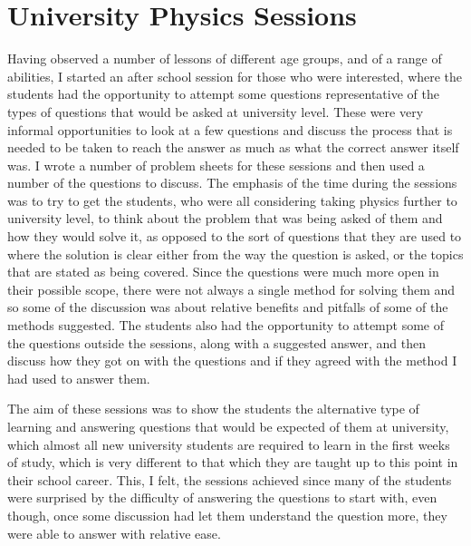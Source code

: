 \section{University Physics Sessions} %
\label{sec:university_physics_sessions}
	Having observed a number of lessons of different age groups, and of a range of abilities, I started an after school session for those who were interested, where the students had the opportunity to attempt some questions representative of the types of questions that would be asked at university level. These were very informal opportunities to look at a few questions and discuss the process that is needed to be taken to reach the answer as much as what the correct answer itself was. I wrote a number of problem sheets for these sessions and then used a number of the questions to discuss. The emphasis of the time during the sessions was to try to get the students, who were all considering taking physics further to university level, to think about the problem that was being asked of them and how they would solve it, as opposed to the sort of questions that they are used to where the solution is clear either from the way the question is asked, or the topics that are stated as being covered. Since the questions were much more open in their possible scope, there were not always a single method for solving them and so some of the discussion was about relative benefits and pitfalls of some of the methods suggested. The students also had the opportunity to attempt some of the questions outside the sessions, along with a suggested answer, and then discuss how they got on with the questions and if they agreed with the method I had used to answer them.

	The aim of these sessions was to show the students the alternative type of learning and answering questions that would be expected of them at university, which almost all new university students are required to learn in the first weeks of study, which is very different to that which they are taught up to this point in their school career. This, I felt, the sessions achieved since many of the students were surprised by the difficulty of answering the questions to start with, even though, once some discussion had let them understand the question more, they were able to answer with relative ease.

